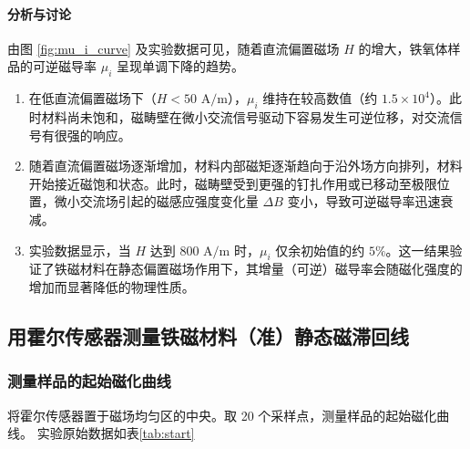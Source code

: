 \documentclass[11pt]{article}
\begin{document}
\paragraph{分析与讨论}
由图 \ref{fig:mu_i_curve} 及实验数据可见，随着直流偏置磁场 $H$ 的增大，铁氧体样品的可逆磁导率 $\mu_i$ 呈现单调下降的趋势。
\begin{enumerate}
    \item 在低直流偏置磁场下（$H < 50\text{ A/m}$），$\mu_i$ 维持在较高数值（约 $1.5\times 10^4$）。此时材料尚未饱和，磁畴壁在微小交流信号驱动下容易发生可逆位移，对交流信号有很强的响应。
    \item 随着直流偏置磁场逐渐增加，材料内部磁矩逐渐趋向于沿外场方向排列，材料开始接近磁饱和状态。此时，磁畴壁受到更强的钉扎作用或已移动至极限位置，微小交流场引起的磁感应强度变化量 $\Delta B$ 变小，导致可逆磁导率迅速衰减。
    \item 实验数据显示，当 $H$ 达到 $800\text{ A/m}$ 时，$\mu_i$ 仅余初始值的约 $5\%$。这一结果验证了铁磁材料在静态偏置磁场作用下，其增量（可逆）磁导率会随磁化强度的增加而显著降低的物理性质。
\end{enumerate}

\subsection{用霍尔传感器测量铁磁材料（准）静态磁滞回线}

\subsubsection{测量样品的起始磁化曲线}

将霍尔传感器置于磁场均匀区的中央。取 20 个采样点，测量样品的起始磁化曲线。
实验原始数据如表\ref{tab:start}
\end{document}
